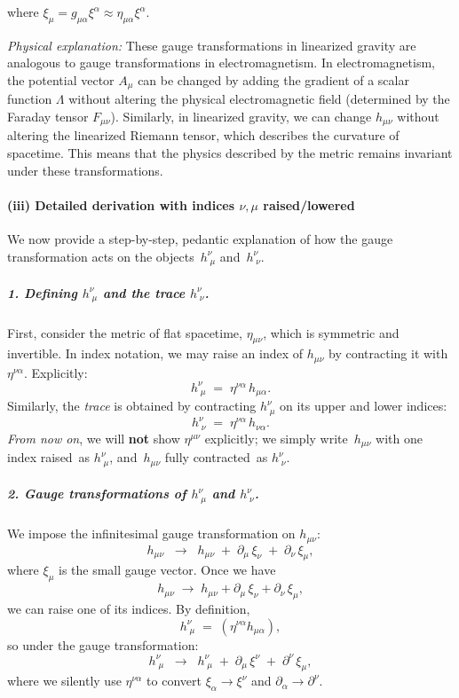 where $\xi_{\mu} = g_{\mu \alpha} \xi^{\alpha} \approx \eta_{\mu \alpha} \xi^{\alpha}$.

\textit{Physical explanation:} These gauge transformations in linearized gravity are analogous to gauge transformations in electromagnetism. In electromagnetism, the potential vector $A_{\mu}$ can be changed by adding the gradient of a scalar function $\Lambda$ without altering the physical electromagnetic field (determined by the Faraday tensor $F_{\mu\nu}$). Similarly, in linearized gravity, we can change $h_{\mu\nu}$ without altering the linearized Riemann tensor, which describes the curvature of spacetime. This means that the physics described by the metric remains invariant under these transformations.

\paragraph{(iii) Detailed derivation with indices \boldmath\(\nu,\mu\) raised/lowered}

We now provide a step-by-step, pedantic explanation of how the gauge transformation acts on the objects
\(\,h^\nu_{\;\mu}\) and \(\,h^\nu_{\;\nu}\).

\medskip

\noindent
\subparagraph{1. Defining \boldmath\(h^\nu_{\;\mu}\) and the trace \boldmath\(h^\nu_{\;\nu}\).}
First, consider the metric of flat spacetime, \(\eta_{\mu\nu}\), which is symmetric and invertible. In index notation, we may raise an index of \(h_{\mu\nu}\) by contracting it with \(\eta^{\nu\alpha}\). Explicitly:
\[
h^\nu_{\;\mu}
  \;=\; 
\eta^{\nu\alpha}\,h_{\mu\alpha}.
\]
Similarly, the \emph{trace} is obtained by contracting \(h^\nu_{\;\mu}\) on its upper and lower indices:
\[
h^\nu_{\;\nu}
  \;=\;
\eta^{\nu\alpha}\,h_{\nu\alpha}.
\]
\emph{From now on}, we will \textbf{not} show \(\eta^{\mu\nu}\) explicitly; we simply write 
 \(\,h_{\mu\nu}\) with one index raised\,  as \(h^\nu_{\;\mu}\), and
 \(\,h_{\mu\nu}\) fully contracted\,  as \(h^\nu_{\;\nu}\).

\medskip

\noindent
\subparagraph{2. Gauge transformations of \boldmath\(h^\nu_{\;\mu}\) and \boldmath\(h^\nu_{\;\nu}\).}
We impose the infinitesimal gauge transformation on \(h_{\mu\nu}\):
\[
h_{\mu\nu}
  \;\;\longrightarrow\;\;
h_{\mu\nu}
  \;+\;
\partial_\mu \,\xi_\nu
  \;+\;
\partial_\nu \,\xi_\mu,
\]
where \(\xi_\mu\) is the small gauge vector.  Once we have 
\[
h_{\mu\nu} \;\to\; h_{\mu\nu} + \partial_\mu\,\xi_\nu + \partial_\nu\,\xi_\mu,
\]
we can  raise  one of its indices.  By definition,
\[
h^\nu_{\;\mu}
  \;=\;
(\eta^{\nu\alpha} h_{\mu\alpha}),
\]
so under the gauge transformation:
\[
h^\nu_{\;\mu}
  \;\;\longrightarrow\;\;
h^\nu_{\;\mu}
  \;+\;
\partial_\mu \,\xi^\nu
  \;+\;
\partial^\nu \,\xi_\mu,
\]
where we silently use \(\eta^{\nu\alpha}\) to convert \(\xi_\alpha \to \xi^\nu\) and 
\(\partial_\alpha \to \partial^\nu\).  

